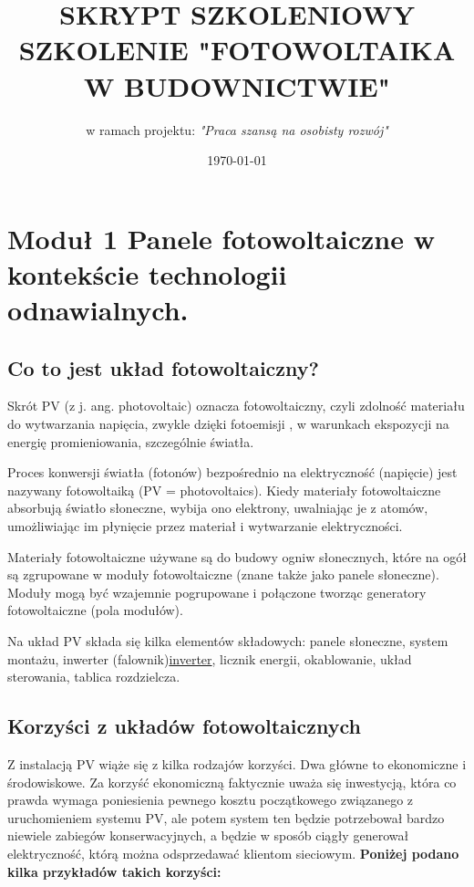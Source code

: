 \documentclass[12pt,a4paper]{article}
\title{SKRYPT SZKOLENIOWY SZKOLENIE "FOTOWOLTAIKA W BUDOWNICTWIE"}
\author{w ramach projektu: \textit{"Praca szansą na osobisty rozwój"} }
\date{\today}
\begin{document}
\maketitle
\tableofcontents

\section{Moduł 1 Panele fotowoltaiczne w kontekście technologii odnawialnych. }

\subsection{Co to jest układ fotowoltaiczny? }
Skrót PV (z j. ang. photovoltaic) oznacza fotowoltaiczny, czyli zdolność 
materiału do wytwarzania napięcia, zwykle dzięki fotoemisji , w warunkach 
ekspozycji na energię promieniowania, szczególnie światła. 

Proces konwersji światła (fotonów) bezpośrednio na elektryczność 
(napięcie) jest nazywany fotowoltaiką (PV = photovoltaics). Kiedy 
materiały fotowoltaiczne absorbują światło słoneczne, wybija ono 
elektrony, uwalniając je z atomów, umożliwiając im płynięcie przez 
materiał i wytwarzanie elektryczności. 

Materiały fotowoltaiczne używane są do budowy ogniw słonecznych, które 
na ogół są zgrupowane w moduły fotowoltaiczne  (znane także jako panele 
słoneczne). Moduły mogą być wzajemnie pogrupowane i połączone tworząc 
generatory fotowoltaiczne  (pola modułów). 

Na układ PV składa się kilka elementów składowych: panele słoneczne, 
system montażu, inwerter (falownik)\hyperlink{falownik}{inverter}, licznik energii, okablowanie, układ 
sterowania, tablica rozdzielcza. 

\subsection{Korzyści z układów fotowoltaicznych }

Z instalacją PV wiąże się z kilka rodzajów korzyści. Dwa główne to 
ekonomiczne i środowiskowe. Za korzyść ekonomiczną faktycznie uważa się 
inwestycją, która co prawda wymaga poniesienia pewnego kosztu 
początkowego związanego z uruchomieniem systemu PV, ale potem system ten 
będzie potrzebował bardzo niewiele zabiegów konserwacyjnych, a będzie w 
sposób ciągły generował elektryczność, którą można odsprzedawać klientom 
sieciowym. \textbf{Poniżej podano kilka przykładów takich korzyści: }
\end{document}
